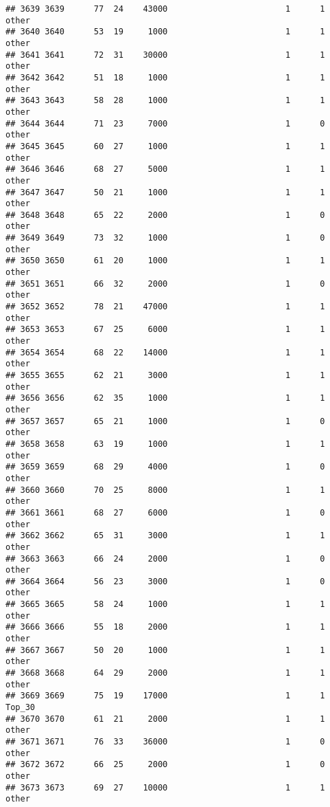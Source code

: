 \documentclass[
]{article}
\begin{document}
\begin{verbatim}
## 3639 3639      77  24    43000                        1      1    other
## 3640 3640      53  19     1000                        1      1    other
## 3641 3641      72  31    30000                        1      1    other
## 3642 3642      51  18     1000                        1      1    other
## 3643 3643      58  28     1000                        1      1    other
## 3644 3644      71  23     7000                        1      0    other
## 3645 3645      60  27     1000                        1      1    other
## 3646 3646      68  27     5000                        1      1    other
## 3647 3647      50  21     1000                        1      1    other
## 3648 3648      65  22     2000                        1      0    other
## 3649 3649      73  32     1000                        1      0    other
## 3650 3650      61  20     1000                        1      1    other
## 3651 3651      66  32     2000                        1      0    other
## 3652 3652      78  21    47000                        1      1    other
## 3653 3653      67  25     6000                        1      1    other
## 3654 3654      68  22    14000                        1      1    other
## 3655 3655      62  21     3000                        1      1    other
## 3656 3656      62  35     1000                        1      1    other
## 3657 3657      65  21     1000                        1      0    other
## 3658 3658      63  19     1000                        1      1    other
## 3659 3659      68  29     4000                        1      0    other
## 3660 3660      70  25     8000                        1      1    other
## 3661 3661      68  27     6000                        1      0    other
## 3662 3662      65  31     3000                        1      1    other
## 3663 3663      66  24     2000                        1      0    other
## 3664 3664      56  23     3000                        1      0    other
## 3665 3665      58  24     1000                        1      1    other
## 3666 3666      55  18     2000                        1      1    other
## 3667 3667      50  20     1000                        1      1    other
## 3668 3668      64  29     2000                        1      1    other
## 3669 3669      75  19    17000                        1      1   Top_30
## 3670 3670      61  21     2000                        1      1    other
## 3671 3671      76  33    36000                        1      0    other
## 3672 3672      66  25     2000                        1      0    other
## 3673 3673      69  27    10000                        1      1    other

\end{verbatim}
\end{document}
